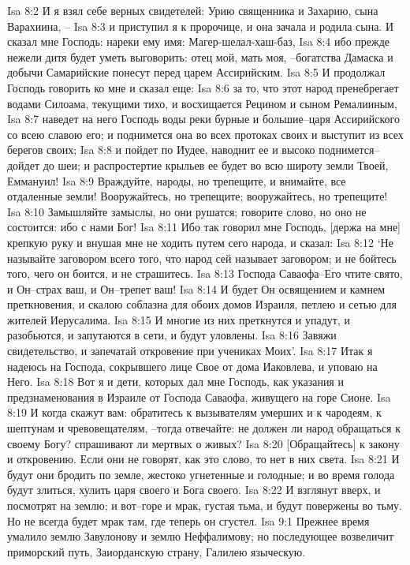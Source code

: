 Isa 8:2  И я взял себе верных свидетелей: Урию священника и Захарию, сына Варахиина, --
Isa 8:3  и приступил я к пророчице, и она зачала и родила сына. И сказал мне Господь: нареки ему имя: Магер-шелал-хаш-баз,
Isa 8:4  ибо прежде нежели дитя будет уметь выговорить: отец мой, мать моя, --богатства Дамаска и добычи Самарийские понесут перед царем Ассирийским.
Isa 8:5  И продолжал Господь говорить ко мне и сказал еще:
Isa 8:6  за то, что этот народ пренебрегает водами Силоама, текущими тихо, и восхищается Рецином и сыном Ремалииным,
Isa 8:7  наведет на него Господь воды реки бурные и большие--царя Ассирийского со всею славою его; и поднимется она во всех протоках своих и выступит из всех берегов своих;
Isa 8:8  и пойдет по Иудее, наводнит ее и высоко поднимется--дойдет до шеи; и распростертие крыльев ее будет во всю широту земли Твоей, Еммануил!
Isa 8:9  Враждуйте, народы, но трепещите, и внимайте, все отдаленные земли! Вооружайтесь, но трепещите; вооружайтесь, но трепещите!
Isa 8:10  Замышляйте замыслы, но они рушатся; говорите слово, но оно не состоится: ибо с нами Бог!
Isa 8:11  Ибо так говорил мне Господь, [держа на мне] крепкую руку и внушая мне не ходить путем сего народа, и сказал:
Isa 8:12  `Не называйте заговором всего того, что народ сей называет заговором; и не бойтесь того, чего он боится, и не страшитесь.
Isa 8:13  Господа Саваофа--Его чтите свято, и Он--страх ваш, и Он--трепет ваш!
Isa 8:14  И будет Он освящением и камнем преткновения, и скалою соблазна для обоих домов Израиля, петлею и сетью для жителей Иерусалима.
Isa 8:15  И многие из них преткнутся и упадут, и разобьются, и запутаются в сети, и будут уловлены.
Isa 8:16  Завяжи свидетельство, и запечатай откровение при учениках Моих'.
Isa 8:17  Итак я надеюсь на Господа, сокрывшего лице Свое от дома Иаковлева, и уповаю на Него.
Isa 8:18  Вот я и дети, которых дал мне Господь, как указания и предзнаменования в Израиле от Господа Саваофа, живущего на горе Сионе.
Isa 8:19  И когда скажут вам: обратитесь к вызывателям умерших и к чародеям, к шептунам и чревовещателям, --тогда отвечайте: не должен ли народ обращаться к своему Богу? спрашивают ли мертвых о живых?
Isa 8:20  [Обращайтесь] к закону и откровению. Если они не говорят, как это слово, то нет в них света.
Isa 8:21  И будут они бродить по земле, жестоко угнетенные и голодные; и во время голода будут злиться, хулить царя своего и Бога своего.
Isa 8:22  И взглянут вверх, и посмотрят на землю; и вот--горе и мрак, густая тьма, и будут повержены во тьму. Но не всегда будет мрак там, где теперь он сгустел.
Isa 9:1  Прежнее время умалило землю Завулонову и землю Неффалимову; но последующее возвеличит приморский путь, Заиорданскую страну, Галилею языческую.
